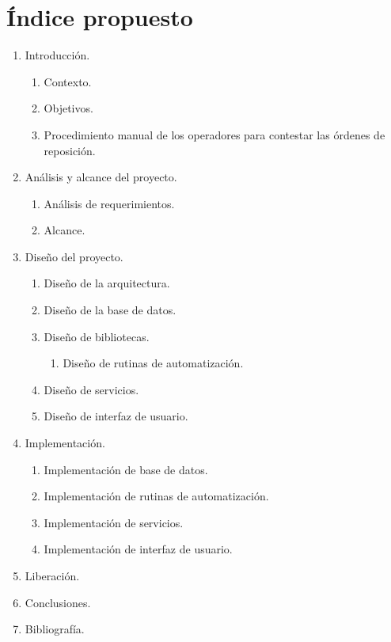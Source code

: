 \documentclass[letterpaper,11pt]{article}
\begin{document}
\section{Índice propuesto}
\renewcommand{\labelenumii}{\arabic{enumi}.\arabic{enumii}.}
\renewcommand{\labelenumiii}{\arabic{enumi}.\arabic{enumii}.\arabic{enumiii}.}
\begin{enumerate}
  \item Introducción.
  \begin{enumerate}
    \item Contexto.
    \item Objetivos.
    \item Procedimiento manual de los operadores para contestar las órdenes de reposición.
  \end{enumerate}
  \item Análisis y alcance del proyecto.
  \begin{enumerate}
    \item Análisis de requerimientos.
    \item Alcance.
  \end{enumerate}
\item Diseño del proyecto.
\begin{enumerate}
  \item Diseño de la arquitectura.
  \item Diseño de la base de datos.
  \item Diseño de bibliotecas.
  \begin{enumerate}
    \item Diseño de rutinas de automatización.
  \end{enumerate}
  \item Diseño de servicios.
  \item Diseño de interfaz de usuario.
\end{enumerate}
\item Implementación.
\begin{enumerate}
  \item Implementación de base de datos.
  \item Implementación de rutinas de automatización.
  \item Implementación de servicios.
  \item Implementación de interfaz de usuario.
\end{enumerate}
\item Liberación.
\item Conclusiones.
\item Bibliografía.
\end{enumerate}
\end{document}
